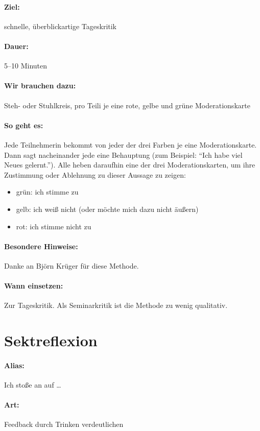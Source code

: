 \paragraph{Ziel:} schnelle, überblickartige Tageskritik
\paragraph{Dauer:} 5--10 Minuten
\paragraph{Wir brauchen dazu:} Steh- oder Stuhlkreis, pro Teili je eine rote, gelbe und grüne Moderationskarte
\paragraph{So geht es:} Jede Teilnehmerin bekommt von jeder der drei Farben je eine Moderationskarte. Dann sagt nacheinander jede eine Behauptung (zum Beispiel: "`Ich habe viel Neues gelernt."'). Alle heben daraufhin eine der drei Moderationskarten, um ihre Zustimmung oder Ablehnung zu dieser Aussage zu zeigen:
\begin{itemize}
  \item grün: ich stimme zu
  \item gelb: ich weiß nicht (oder möchte mich dazu nicht äußern)
  \item rot: ich stimme nicht zu
\end{itemize}

\paragraph{Besondere Hinweise:} Danke an Björn Krüger für diese Methode.
\paragraph{Wann einsetzen:} Zur Tageskritik. Als Seminarkritik ist die Methode zu wenig qualitativ.

\section{Sektreflexion}
\paragraph{Alias:} Ich stoße an auf \ldots
\paragraph{Art:} Feedback durch Trinken verdeutlichen

